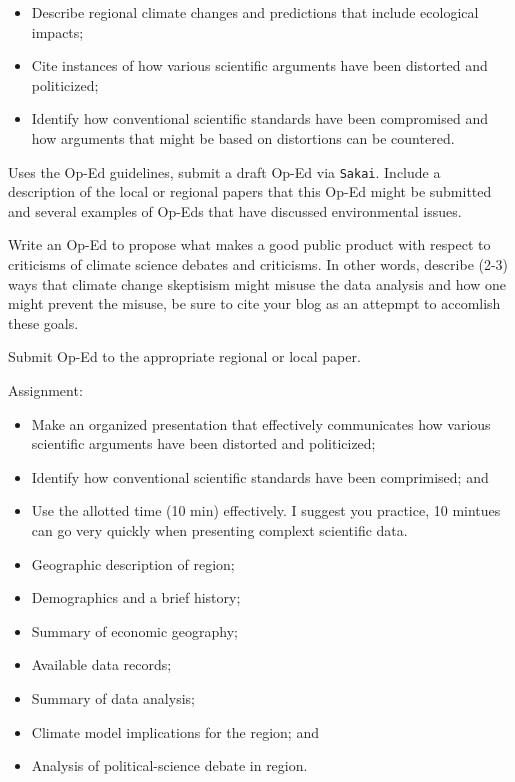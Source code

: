 \documentclass{article}\usepackage[]{graphicx}\usepackage[]{color}
\begin{document}
\begin{itemize}
  \item Describe regional climate changes and predictions that include ecological impacts; 
  \item Cite instances of how various scientific arguments have been distorted and politicized;
  \item Identify how conventional scientific standards have been compromised and how arguments that might be based on distortions can be countered.
\end{itemize}

Uses the Op-Ed guidelines, submit a draft Op-Ed via \texttt{Sakai}. Include a description of the local or regional papers that this Op-Ed might be submitted and several examples of Op-Eds that have discussed environmental issues.

Write an Op-Ed to propose what makes a good public product with respect to criticisms of climate science debates and criticisms. In other words, describe (2-3) ways that climate change skeptisism might misuse the data analysis and how one might prevent the misuse, be sure to cite your blog as an attepmpt to accomlish these goals. 

Submit Op-Ed to the appropriate regional or local paper.

\noindent Assignment: 
\begin{itemize}
  \item Make an organized presentation that effectively communicates how various scientific arguments have been distorted and politicized;
  \item Identify how conventional scientific standards have been comprimised; and
  \item Use the allotted time (10 min) effectively. I suggest you practice, 10 mintues can go very quickly when presenting complext scientific data.
  
\end{itemize}


\begin{itemize}
  \item Geographic description of region;
  \item Demographics and a brief history;
  \item Summary of economic geography;
  \item Available data records;
  \item Summary of data analysis;
  \item Climate model implications for the region; and
  \item Analysis of political-science debate in region.
  
\end{itemize}
\end{document}
